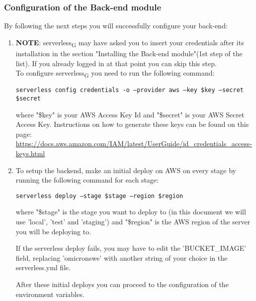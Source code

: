 \subsubsection{Configuration of the Back-end module}
By following the next steps you will successfully configure your back-end:
\begin{enumerate}
\item \textbf{NOTE}: serverless\textsubscript{G} may have asked you to insert your credentials after its installation in the section "Installing the Back-end module"(1st step of the list). If you already logged in at that point you can skip this step.\\ 
To configure serverless\textsubscript{G} you need to run the following command:
\begin{center}
\texttt{serverless config credentials -o --provider aws --key \$key --secret \$secret}
\end{center}
where "\$key" is your AWS Access Key Id and "\$secret" is your AWS Secret Access Key.
Instructions on how to generate these keys can be found on this page: \url{https://docs.aws.amazon.com/IAM/latest/UserGuide/id_credentials_access-keys.html}

\item To setup the backend, make an initial deploy on AWS on every stage by running the following command for each stage:
\begin{center}
\texttt{serverless deploy --stage \$stage --region \$region}
\end{center}
where "\$stage" is the stage you want to deploy to (in this document we will use 'local', 'test' and 'staging') and "\$region" is the AWS region of the server you will be deploying to.

If the serverless deploy fails, you may have to edit the 'BUCKET_IMAGE' field, replacing 'omicronswe' with another string of your choice in the serverless.yml file.

After these initial deploys you can proceed to the configuration of the environment variables.
\end{enumerate}

